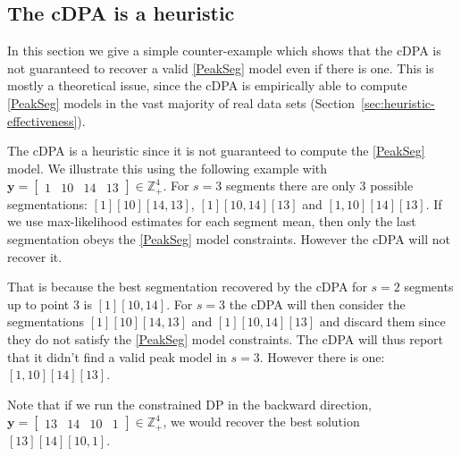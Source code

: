 \documentclass{article}
\newcommand{\ZZ}{\mathbb Z}
\begin{document}
\subsection{The cDPA is a heuristic}
\label{sec:dp-fails}

In this section we give a simple counter-example which shows that the
cDPA is not guaranteed to recover a valid \ref{PeakSeg} model even if
there is one.  This is mostly a theoretical issue, since 
the cDPA is empirically able to compute \ref{PeakSeg} models in the vast
majority of real data sets
(Section~\ref{sec:heuristic-effectiveness}).

The cDPA is a heuristic since it is not guaranteed to compute the
\ref{PeakSeg} model. We illustrate this using the following 
example with $\mathbf y = \left[\begin{array}{cccc} 1 & 10 & 14 & 13
\end{array}\right]\in\ZZ_+^4
$. For $s=3$ segments there are only 3 possible segmentations:
$[1][10][14, 13]$, $[1][10, 14][13]$ and $[1, 10][14][13]$. If we use
max-likelihood estimates for each segment mean, then only the last
segmentation obeys the \ref{PeakSeg} model constraints. However the
cDPA will not recover it.

That is because the best segmentation recovered by the cDPA for $s=2$
segments up to point $3$ is $[1][10, 14]$.
For $s=3$ the cDPA will then consider the segmentations $[1][10][14,
13]$ and $[1][10, 14][13]$ and discard them since they do not satisfy
the \ref{PeakSeg} model constraints. The cDPA will thus report that it
didn't find a valid peak model in $s=3$. However there is one: $[1,
10][14][13]$.

Note that if we run the constrained DP in the backward direction, 
$\mathbf y = \left[\begin{array}{cccc} 13 & 14 & 10 & 1
\end{array}\right]\in\ZZ_+^4
$, we would recover the best solution $[13][14][10, 1]$.



\end{document}
